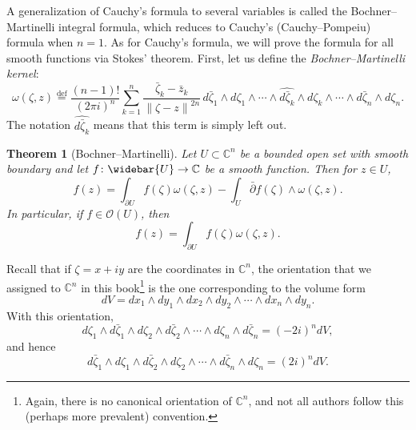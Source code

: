\documentclass[12pt,openany]{book}
\newcommand{\norm}[1]{\left\lVert {#1} \right\rVert}
\newcommand{\C}{{\mathbb{C}}}
\newcommand{\sO}{{\mathscr{O}}}
\newcommand{\myindex}[1]{#1\index{#1}}
\theoremstyle{plain}
\newtheorem{thm}{Theorem}[section]
\theoremstyle{remark}
\theoremstyle{definition}
\theoremstyle{exercise}
\theoremstyle{example}
\begin{document}
A generalization of
Cauchy's formula to several variables
is called the Bochner--Martinelli integral formula,
which reduces
to Cauchy's (Cauchy--Pompeiu) formula when $n=1$.
As for Cauchy's formula, we will prove the formula for all
smooth functions via Stokes' theorem.
First, let us define the \emph{\myindex{Bochner--Martinelli kernel}}:
\begin{equation*}
\omega(\zeta,z)
\overset{\text{def}}{=}
\frac{(n-1)!}{{(2\pi i)}^n}
\sum_{k=1}^n
\frac{\bar{\zeta}_k-\bar{z}_k}{\norm{\zeta-z}^{2n}}
\,
d\bar{\zeta}_1 \wedge d\zeta_1 \wedge
\cdots \wedge
\widehat{ d\bar{\zeta}_k } \wedge d\zeta_k \wedge
\cdots \wedge
d\bar{\zeta}_n \wedge d\zeta_n .
\end{equation*}
%
The notation $\widehat{ d\bar{\zeta}_k }$ means that this term is
simply left out.

\begin{thm}[Bochner--Martinelli] \label{thm:bochnermartinelli}
Let $U \subset \C^n$ be a bounded open set with smooth boundary and let
$f \colon \widebar{U} \to \C$ be a smooth function.
Then for $z \in U$,
\begin{equation*}
f(z) =
\int_{\partial U}
f(\zeta) \omega(\zeta,z)
-
\int_{U}
\bar{\partial} f(\zeta) \wedge \omega(\zeta,z) .
\end{equation*}
In particular, if $f \in \sO(U)$, then
\begin{equation*}
f(z) =
\int_{\partial U}
f(\zeta) \omega(\zeta,z) .
\end{equation*}
\end{thm}

Recall that if $\zeta = x+iy$ are the coordinates in $\C^n$, the orientation that we assigned to $\C^n$ in
this book\footnote{Again, there is
no canonical orientation of $\C^n$, and
not all authors follow this (perhaps more prevalent) convention.}
is the one corresponding to the volume form
%
\begin{equation*}
dV = dx_1 \wedge dy_1 \wedge dx_2 \wedge dy_2 \wedge \cdots \wedge dx_n \wedge dy_n .
\end{equation*}
With this orientation,
\begin{equation*}
d\zeta_1 \wedge d\bar{\zeta}_1 \wedge
d\zeta_2 \wedge d\bar{\zeta}_2 \wedge
\cdots \wedge
d\zeta_n \wedge d\bar{\zeta}_n = {(-2i)}^n dV ,
\end{equation*}
and hence
\begin{equation*}
d\bar{\zeta}_1 \wedge d\zeta_1 \wedge
d\bar{\zeta}_2 \wedge d\zeta_2 \wedge
\cdots \wedge
d\bar{\zeta}_n \wedge d\zeta_n = {(2i)}^n dV .
\end{equation*}
\end{document}
